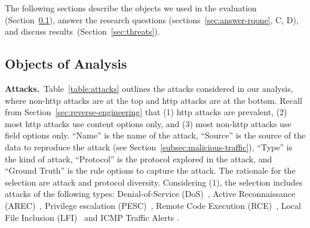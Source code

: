 \documentclass[conference]{IEEEtran}
\begin{document}
The following sections describe the objects we used in the evaluation
(Section~\ref{sec:dataset-benign}), answer the research questions
(sections~\ref{sec:answer-rqone}, C, D), and discuss
results~(Section~\ref{sec:threats}).



\subsection{Objects of Analysis}
\label{sec:dataset-benign}
\label{attack-reproduction}
\label{subsec:malicious-traffic}
\label{sec:objectanalysis-benign}


\noindent\textbf{Attacks.}~Table~\ref{table:attacks} outlines the
attacks considered in our analysis, where non-http attacks are at 
the top and http attacks are at the bottom. Recall from
Section~\ref{sec:reverse-engineering} that (1) http attacks are
prevalent, (2) most http attacks use content options only, and (3)
most non-http attacks use field options only. 
``Name'' is the name of the attack,
``Source'' is the source of the data to reproduce the
attack (see Section~\ref{subsec:malicious-traffic}), ``Type''
is the kind of attack, ``Protocol'' is the
protocol explored in the attack, and ``Ground Truth'' is the
rule options to capture the attack. The rationale for the selection
are attack and protocol diversity. Considering (1), 
the selection includes attacks of
the following types: Denial-of-Service (DoS)~\cite{denial-of-service},
Active Reconnaissance (AREC)~\cite{active-reconnaissance}, Privilege
escalation (PESC)~\cite{privilege-escalation}, Remote Code Execution
(RCE)~\cite{remote-code-execution}, Local File Inclusion
(LFI)~\cite{local-file-inclusion} and ICMP Traffic Alerts \cite{icmp-types}.
\end{document}
